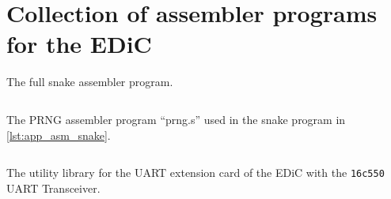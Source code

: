 \chapter[Collection of assembler programs]{Collection of assembler programs for the \gls{EDiC}}
\begin{multipagecode}
  \caption{The full snake assembler program.}
  \begin{multicols}{2}
    \inputminted[linenos,
      breaklines,
      frame=leftline,
      xleftmargin=20pt,
    ]{ARM}{src/snake.s}
  \end{multicols}
  \label{lst:app_asm_snake}
\end{multipagecode}

\begin{multipagecode}
  \caption{The \gls{PRNG} assembler program ``prng.s'' used in the snake program in \cref{lst:app_asm_snake}.}
  \inputminted[linenos,
    breaklines,
    frame=leftline,
    xleftmargin=20pt,
  ]{ARM}{src/prng.s}
  \label{lst:app_asm_prng}
\end{multipagecode}

\begin{multipagecode}
  \caption{The utility library for the \gls{UART} extension card of the \gls{EDiC} with the \texttt{16c550} \gls{UART} Transceiver.}
  \begin{multicols}{2}
    \inputminted[linenos,
      breaklines,
      frame=leftline,
      xleftmargin=20pt,
    ]{ARM}{src/uart_16c550.s}
  \end{multicols}
  \label{lst:app_asm_uart}
\end{multipagecode}
